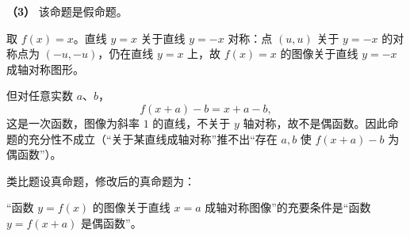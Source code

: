 \begin{answer}
\textbf{（3）} 该命题是假命题。

取 $f(x)=x$。直线 $y=x$ 关于直线 $y=-x$ 对称：点 $(u,u)$ 关于 $y=-x$ 的对称点为 $(-u,-u)$，仍在直线 $y=x$ 上，故 $f(x)=x$ 的图像关于直线 $y=-x$ 成轴对称图形。

但对任意实数 $a$、$b$，
\nopagebreak[4]
\[f(x+a)-b=x+a-b,\]
这是一次函数，图像为斜率 $1$ 的直线，不关于 $y$ 轴对称，故不是偶函数。因此命题的充分性不成立（“关于某直线成轴对称”推不出“存在 $a,b$ 使 $f(x+a)-b$ 为偶函数”）。

类比题设真命题，修改后的真命题为：

“函数 $y=f(x)$ 的图像关于直线 $x=a$ 成轴对称图像”的充要条件是“函数 $y=f(x+a)$ 是偶函数”。




\end{answer}